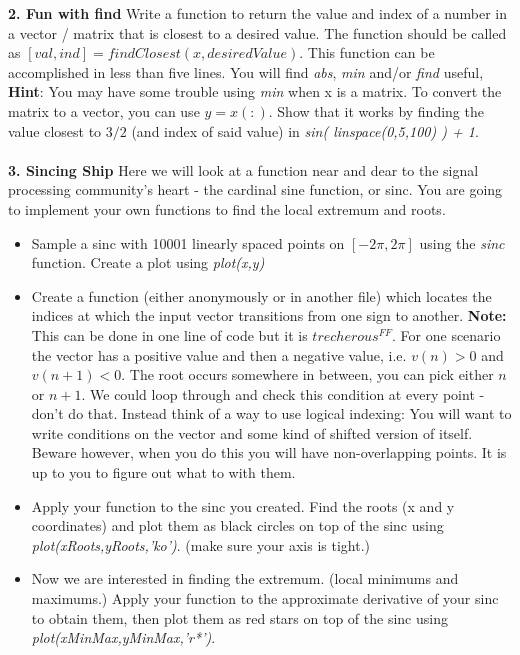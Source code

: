 \documentclass{article}
\begin{document}
\noindent \textbf{2. Fun with find} Write a function to return the value and index of a number in a vector / matrix that is closest to a desired value. The function should be called as $[val, ind] = findClosest(x, desiredValue)$. This function can be accomplished in less than five lines. You will find \emph{abs}, \emph{min} and/or \emph{find} useful, \textbf{Hint}: You may have some trouble using \emph{min} when x is a matrix. To convert the matrix to a vector, you can use $y = x(:)$.  Show that it works by finding the value closest to $3/2$ (and index of said value) in \emph{sin( linspace(0,5,100) ) + 1}.
\\\\
\noindent \textbf{3. Sincing Ship} Here we will look at a function near and dear to the signal processing community's heart - the cardinal sine function, or sinc.  You are going to implement your own functions to find the local extremum and roots.
\begin{itemize}
\item Sample a sinc with 10001 linearly spaced points on $[-2\pi, 2\pi]$ using the \emph{sinc} function.  Create a plot using \emph{plot(x,y)}
\item Create a function (either anonymously or in another file) which locates the indices at which the input vector transitions from one sign to another. \textbf{Note:} This can be done in one line of code but it is $trecherous^{FF}$.  For one scenario the vector has a positive value and then a negative value, i.e. $v(n) > 0$ and $v(n+1) < 0$.  The root occurs somewhere in between, you can pick either $n$ or $n+1$.  We could loop through and check this condition at every point - don't do that.  Instead think of a way to use logical indexing: You will want to write conditions on the vector and some kind of shifted version of itself.  Beware however, when you do this you will have non-overlapping points.  It is up to you to figure out what to with them.
\item Apply your function to the sinc you created.  Find the roots (x and y coordinates) and plot them as black circles on top of the sinc using \emph{plot(xRoots,yRoots,'ko')}.  (make sure your axis is tight.)  
\item Now we are interested in finding the extremum. (local minimums and maximums.) Apply your function to the approximate derivative of your sinc to obtain them, then plot them as red stars on top of the sinc using \emph{plot(xMinMax,yMinMax,'r*')}.
\end{itemize}
\end{document}

